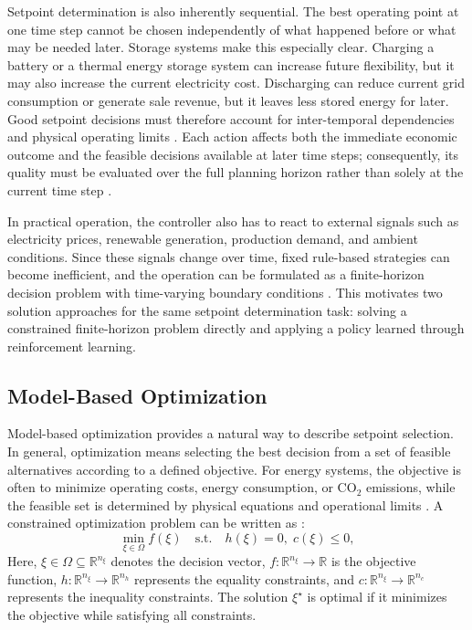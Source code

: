 \documentclass[12pt]{article}
\begin{document}
Setpoint determination is also inherently sequential. The best operating point at one time step cannot be chosen independently of what happened before or what may be needed later. Storage systems make this especially clear. Charging a battery or a thermal energy storage system can increase future flexibility, but it may also increase the current electricity cost. Discharging can reduce current grid consumption or generate sale revenue, but it leaves less stored energy for later. Good setpoint decisions must therefore account for inter-temporal dependencies and physical operating limits \cite{walden2023nonlinear}. Each action affects both the immediate economic outcome and the feasible decisions available at later time steps; consequently, its quality must be evaluated over the full planning horizon rather than solely at the current time step \cite{takam2025stochastic}.

In practical operation, the controller also has to react to external signals such as electricity prices, renewable generation, production demand, and ambient conditions. Since these signals change over time, fixed rule-based strategies can become inefficient, and the operation can be formulated as a finite-horizon decision problem with time-varying boundary conditions \cite{meng2025online,pilling2025rl}. This motivates two solution approaches for the same setpoint determination task: solving a constrained finite-horizon problem directly and applying a policy learned through reinforcement learning.

\subsection{Model-Based Optimization}

Model-based optimization provides a natural way to describe setpoint selection. In general, optimization means selecting the best decision from a set of feasible alternatives according to a defined objective. For energy systems, the objective is often to minimize operating costs, energy consumption, or CO$_2$ emissions, while the feasible set is determined by physical equations and operational limits \cite{walden2023nonlinear,kyriakidis2025energy}. A constrained optimization problem can be written as \cite{nocedal2006numerical}:
\begin{equation}
\min_{\xi \in \Omega} f(\xi) \quad \text{s.t.} \quad h(\xi) = 0,\; c(\xi) \le 0,
\label{eq:general_constrained_optimization}
\end{equation}
Here, $\xi \in \Omega \subseteq \mathbb{R}^{n_\xi}$ denotes the decision vector, $f : \mathbb{R}^{n_\xi} \to \mathbb{R}$ is the objective function, $h : \mathbb{R}^{n_\xi} \to \mathbb{R}^{n_h}$ represents the equality constraints, and $c : \mathbb{R}^{n_\xi} \to \mathbb{R}^{n_c}$ represents the inequality constraints. The solution $\xi^\star$ is optimal if it minimizes the objective while satisfying all constraints.
\end{document}

